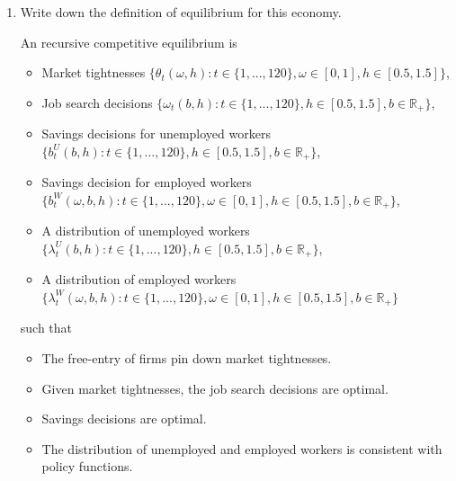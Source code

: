 \documentclass{article}
\newcommand{\R}{\mathbb{R}}
\begin{document}
\begin{enumerate}

\item Write down the definition of equilibrium for this economy.

An recursive competitive equilibrium is

\begin{itemize}

\item Market tightnesses $\{\theta_t(\omega, h): t \in \{1, ..., 120\}, \omega \in [0, 1], h \in [0.5, 1.5]\}$,

\item Job search decisions $\{\omega_t(b, h): t \in \{1, ..., 120\}, h \in [0.5, 1.5], b \in \R_+\}$,

\item Savings decisions for unemployed workers $\{b^U_t(b, h): t \in \{1, ..., 120\}, h \in [0.5, 1.5], b \in \R_+\}$,

\item Savings decision for employed workers $\{b_t^W(\omega, b, h): t \in \{1, ..., 120\}, \omega \in [0, 1], h \in [0.5, 1.5], b \in \R_+\}$, 

\item A distribution of unemployed workers $\{\lambda_t^U(b, h): t \in \{1, ..., 120\}, h \in [0.5, 1.5], b \in \R_+\}$, 

\item A distribution of employed workers $\{\lambda_t^W(\omega, b, h): t \in \{1, ..., 120\}, \omega \in [0, 1], h \in [0.5, 1.5], b \in \R_+\}$ 
 
\end{itemize}

such that

\begin{itemize}

\item The free-entry of firms pin down market tightnesses.

\item Given market tightnesses, the job search decisions are optimal.

\item Savings decisions are optimal.

\item The distribution of unemployed and employed workers is consistent with policy functions.

\end{itemize}

\pagebreak
 

\end{enumerate}
\end{document}
